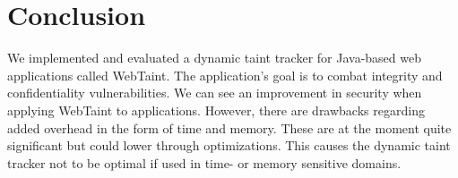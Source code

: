 \chapter{Conclusion}
We implemented and evaluated a dynamic taint tracker for Java-based web applications called WebTaint. The application's goal is to combat integrity and confidentiality vulnerabilities. We can see an improvement in security when applying WebTaint to applications. However, there are drawbacks regarding added overhead in the form of time and memory. These are at the moment quite significant but could lower through optimizations. This causes the dynamic taint tracker not to be optimal if used in time- or memory sensitive domains.